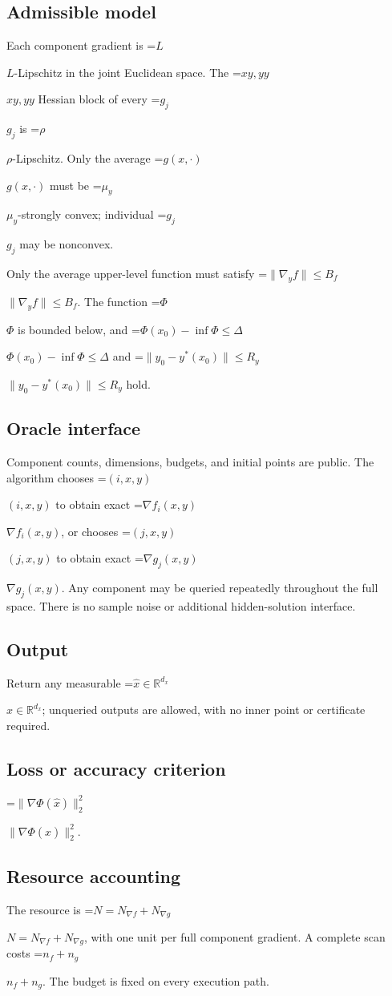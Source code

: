 \documentclass[10pt,a4paper]{article}
\newcommand{\AtlasMath}[1]{\par\begingroup\centering\setbox0=\hbox{$\displaystyle #1$}\ifdim\wd0>1.4\linewidth\typeout{ATLAS WIDE FORMULA: \the\wd0}\fi\ifdim\wd0>\linewidth\resizebox{\linewidth}{!}{\box0}\else\box0\fi\par\endgroup}
\newcommand{\AtlasInlineMath}[1]{\begingroup\setbox0=\hbox{$#1$}\ifdim\wd0>.4\linewidth\endgroup\AtlasMath{#1}\else\endgroup$#1$\fi}
\begin{document}
\subsection{Admissible model}
Each component gradient is \AtlasInlineMath{L}-Lipschitz in the joint Euclidean space. The \AtlasInlineMath{xy,yy} Hessian block of every \AtlasInlineMath{g_j} is \AtlasInlineMath{\rho}-Lipschitz. Only the average \AtlasInlineMath{g(x,\cdot)} must be \AtlasInlineMath{\mu_y}-strongly convex; individual \AtlasInlineMath{g_j} may be nonconvex.

Only the average upper-level function must satisfy \AtlasInlineMath{\|\nabla_yf\|\le B_f}. The function \AtlasInlineMath{\Phi} is bounded below, and \AtlasInlineMath{\Phi(x_0)-\inf\Phi\le\Delta} and \AtlasInlineMath{\|y_0-y^*(x_0)\|\le R_y} hold.

\subsection{Oracle interface}
Component counts, dimensions, budgets, and initial points are public. The algorithm chooses \AtlasInlineMath{(i,x,y)} to obtain exact \AtlasInlineMath{\nabla f_i(x,y)}, or chooses \AtlasInlineMath{(j,x,y)} to obtain exact \AtlasInlineMath{\nabla g_j(x,y)}. Any component may be queried repeatedly throughout the full space. There is no sample noise or additional hidden-solution interface.

\subsection{Output}
Return any measurable \AtlasInlineMath{\widehat{x}\in\mathbb{R}^{d_x}}; unqueried outputs are allowed, with no inner point or certificate required.

\subsection{Loss or accuracy criterion}
\AtlasInlineMath{\|\nabla\Phi(\widehat{x})\|_2^2}.

\subsection{Resource accounting}
The resource is \AtlasInlineMath{N=N_{\nabla f}+N_{\nabla g}}, with one unit per full component gradient. A complete scan costs \AtlasInlineMath{n_f+n_g}. The budget is fixed on every execution path.
\end{document}

